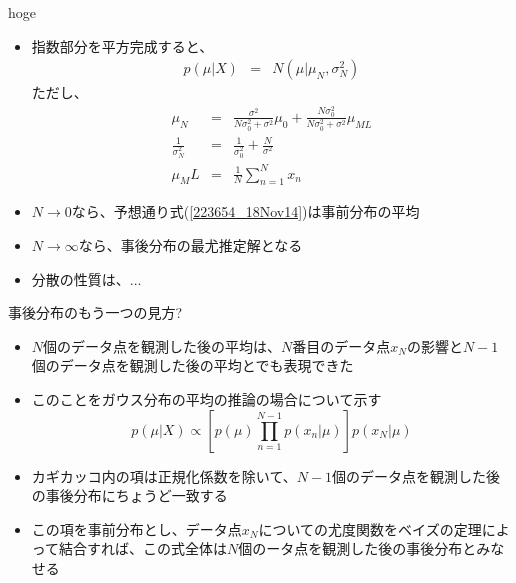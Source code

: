 \begin{frame}{hoge}
 \begin{itemize}
  \item 指数部分を平方完成すると、
        \begin{eqnarray}
         p(\mu|X)&=&N(\mu|\mu_N,\sigma_N^2)
        \end{eqnarray}
        ただし、
        \begin{eqnarray}
                   \mu_N& = & \frac{\sigma^2}{N\sigma_0^2+\sigma^2}\mu_0 + \frac{N\sigma_0^2}{N\sigma_0^2+\sigma^2}\mu_{ML}\label{223654_18Nov14}\\
         \frac{1}{\sigma_N^2}&= & \frac{1}{\sigma_0^2} + \frac{N}{\sigma^2}\\
         \mu_ML&= & \frac{1}{N}\sum_{n=1}^{N}x_n
        \end{eqnarray}
  \item $N\rightarrow0$なら、予想通り式(\ref{223654_18Nov14})は事前分布の平均
  \item $N\rightarrow\infty$なら、事後分布の最尤推定解となる
  \item 分散の性質は、... %
 \end{itemize}
\end{frame}

\begin{frame}{事後分布のもう一つの見方?}
 \begin{itemize}
  \item $N$個のデータ点を観測した後の平均は、$N$番目のデータ点$x_N$の影響と$N-1$個のデータ点を観測した後の平均とでも表現できた
	\item このことをガウス分布の平均の推論の場合について示す
				\begin{equation}
				 p(\mu|X) \propto [p(\mu)\prod_{n=1}^{N-1}p(x_n|\mu)]p(x_N|\mu)
				\end{equation}
	\item カギカッコ内の項は正規化係数を除いて、$N-1$個のデータ点を観測した後の事後分布にちょうど一致する
	\item この項を事前分布とし、データ点$x_N$についての尤度関数をベイズの定理によって結合すれば、この式全体は$N$個のータ点を観測した後の事後分布とみなせる
 \end{itemize}
\end{frame}

